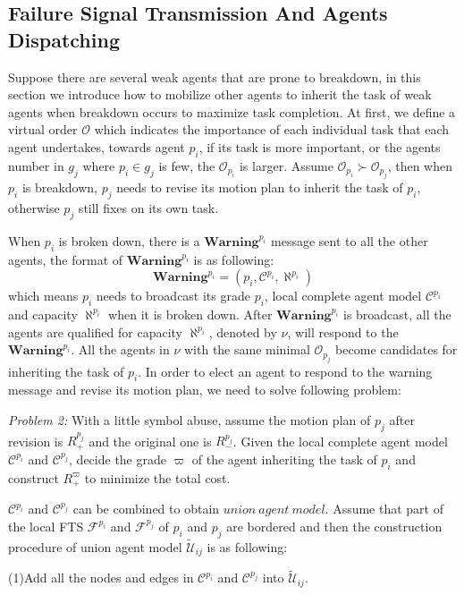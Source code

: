 \documentclass[journal]{IEEEtran}
\begin{document}
\subsection{Failure Signal Transmission And Agents Dispatching}
Suppose there are several weak agents that are prone to breakdown, in this section we introduce how to mobilize other agents to inherit the task of weak agents when breakdown occurs to maximize task completion. At first, we define a virtual order $\mathcal{O}$ which indicates the importance of each individual task that each agent undertakes, towards agent $p_i$, if its task is more important, or the agents number in $g_j$ where $p_i \in g_j$ is few, the $\mathcal{O}_{p_i}$ is larger. Assume $\mathcal{O}_{p_i}\succ \mathcal{O}_{p_j}$, then when $p_i$ is breakdown, $p_j$ needs to revise its motion plan to inherit the task of $p_i$, otherwise $p_j$ still fixes on its own task.\par
When $p_i$ is broken down, there is a $\textbf{Warning}^{p_i}$ message sent to all the other agents, the format of $\textbf{Warning}^{p_i}$ is as following:
$$\textbf{Warning}^{p_i} = (p_i,\mathcal{C}^{p_i},\aleph^{p_i})$$
which means $p_i$ needs to broadcast its grade $p_i$, local complete agent model $\mathcal{C}^{p_i}$ and capacity $\aleph^{p_i}$ when it is broken down. After $\textbf{Warning}^{p_i}$ is broadcast, all the agents are qualified for capacity $\aleph^{p_i}$, denoted by $\nu$, will respond to the $\textbf{Warning}^{p_i}$. All the agents in $\nu$ with the same minimal $\mathcal{O}_{p_j}$ become candidates for inheriting the task of $p_i$. In order to elect an agent to respond to the warning message and revise its motion plan, we need to solve following problem:\par
\emph{Problem 2:} With a little symbol abuse, assume the motion plan of $p_j$ after revision is $R^{p_j}_+$ and the original one is $R^{p_j}_-$. Given the local complete agent model $\mathcal{C}^{p_i}$ and $\mathcal{C}^{p_j}$, decide the grade $\varpi$ of the agent inheriting the task of $p_i$ and construct $R^{\varpi}_+$ to minimize the total cost. \par
$\mathcal{C}^{p_i}$ and $\mathcal{C}^{p_j}$ can be combined to obtain $union\ agent\ model$. Assume that part of the local FTS $\mathcal{F}^{p_i}$ and $\mathcal{F}^{p_j}$ of $p_i$ and $p_j$ are bordered and then the construction procedure of union agent model $\widetilde{\mathcal{U}}_{ij}$ is as following:\par
(1)Add all the nodes and edges in $\mathcal{C}^{p_i}$ and $\mathcal{C}^{p_j}$ into $\widetilde{\mathcal{U}}_{ij}$.\par
\end{document}
